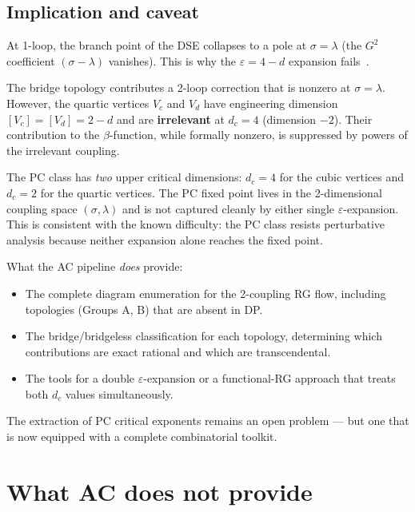 \documentclass[11pt,a4paper]{article}
\theoremstyle{definition}
\begin{document}
\subsection{Implication and caveat}

At 1-loop, the branch point of the DSE collapses to a pole at
$\sigma = \lambda$ (the $G^2$ coefficient $(\sigma{-}\lambda)$
vanishes).  This is why the $\varepsilon = 4 - d$ expansion
fails~\cite{cardytauber1996}.

The bridge topology contributes a 2-loop correction that is nonzero at
$\sigma = \lambda$.  However, the quartic vertices $V_c$ and $V_d$
have engineering dimension $[V_c] = [V_d] = 2 - d$ and are
\textbf{irrelevant} at $d_c = 4$ (dimension $-2$).  Their contribution
to the $\beta$-function, while formally nonzero, is suppressed by
powers of the irrelevant coupling.

The PC class has \emph{two} upper critical dimensions: $d_c = 4$ for
the cubic vertices and $d_c = 2$ for the quartic vertices.  The PC
fixed point lives in the 2-dimensional coupling space $(\sigma, \lambda)$
and is not captured cleanly by either single $\varepsilon$-expansion.
This is consistent with the known difficulty: the PC class resists
perturbative analysis because neither expansion alone reaches the
fixed point.

What the AC pipeline \emph{does} provide:
\begin{itemize}[leftmargin=2em]
\item The complete diagram enumeration for the 2-coupling RG flow,
  including topologies (Groups A, B) that are absent in DP.
\item The bridge/bridgeless classification for each topology,
  determining which contributions are exact rational and which
  are transcendental.
\item The tools for a double $\varepsilon$-expansion or a
  functional-RG approach that treats both $d_c$ values simultaneously.
\end{itemize}

The extraction of PC critical exponents remains an open problem ---
but one that is now equipped with a complete combinatorial toolkit.

\section{What AC does not provide}
\end{document}
